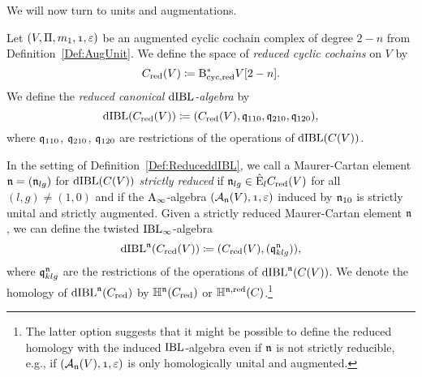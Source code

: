\documentclass[\MainFolder/Text.tex]{subfiles}
\begin{document}
%

We will now turn to units and augmentations.

\begin{Definition}\label{Def:ReduceddIBL}
Let $(V, \Pair, m_1, \NOne, \varepsilon)$ be an augmented cyclic cochain complex of degree $2-n$ from Definition~\ref{Def:AugUnit}. We define the space of \emph{reduced cyclic cochains} on $V$ by
$$ C_{\mathrm{red}}(V)\coloneqq \mathrm{B}_{\mathrm{cyc},\mathrm{red}}^* V[2-n]. $$
We define the \emph{reduced canonical $\mathrm{dIBL}$-algebra} by
$$ \mathrm{dIBL}(C_{\mathrm{red}}(V))\coloneqq (C_{\mathrm{red}}(V), \mathfrak{q}_{110}, \mathfrak{q}_{210}, \mathfrak{q}_{120}), $$
where $\mathfrak{q}_{110}$, $\mathfrak{q}_{210}$, $\mathfrak{q}_{120}$ are restrictions of the operations of $\mathrm{dIBL}(C(V))$.
\end{Definition}

\begin{Definition} \label{Def:StrictlyReduced}
In the setting of Definition~\ref{Def:ReduceddIBL}, we call a Maurer-Cartan element $\mathfrak{n}=(\mathfrak{n}_{lg})$ for $\mathrm{dIBL}(C(V))$ \emph{strictly reduced} if $\mathfrak{n}_{lg}\in \hat{\mathrm{E}}_l C_{\mathrm{red}}(V)$ for all $(l,g)\neq (1,0)$ and if the $\mathrm{A}_\infty$-algebra $(\mathcal{A}_\PMC(V),\NOne,\varepsilon)$ induced by $\mathfrak{n}_{10}$ is strictly unital and strictly augmented.
Given a strictly reduced Maurer-Cartan element $\mathfrak{n}$, we can define the twisted $\mathrm{IBL}_\infty$-algebra
$$ \mathrm{dIBL}^{\mathfrak{n}}(C_{\mathrm{red}}(V)) \coloneqq (C_{\mathrm{red}}(V), (\mathfrak{q}_{klg}^{\mathfrak{n}})), $$
where $\mathfrak{q}_{klg}^{\mathfrak{n}}$ are the restrictions of the operations of $\mathrm{dIBL}^{\mathfrak{n}}(C(V))$. We denote the homology of $\mathrm{dIBL}^{\mathfrak{n}}(C_{\mathrm{red}})$ by $\mathbb{H}^{\mathfrak{n}}(C_{\mathrm{red}})$ or $\mathbb{H}^{\mathfrak{n},\mathrm{red}}(C)$.\footnote{The latter option suggests that it might be possible to define the reduced homology with the induced $\mathrm{IBL}$-algebra even if $\mathfrak{n}$ is not strictly reducible, e.g., if $(\mathcal{A}_\PMC(V),\NOne,\varepsilon)$ is only homologically unital and augmented.}
\end{Definition}

\end{document}
